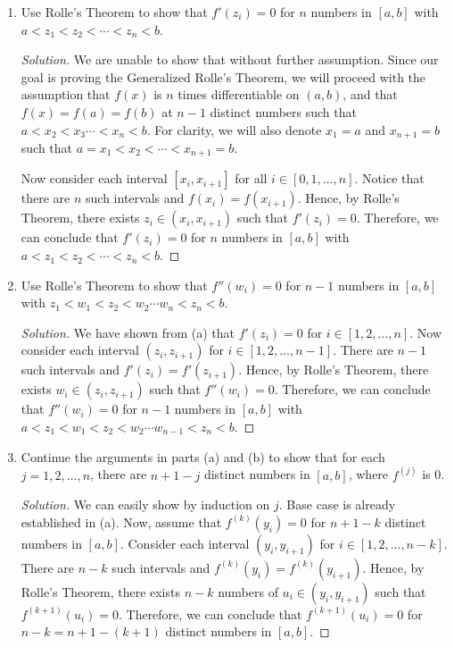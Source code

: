 \documentclass{article}
\begin{document}
\begin{enumerate}[label=\alph*.]
    \item Use Rolle's Theorem to show that $f'(z_i) = 0$ for $n$ numbers in $[a,b]$ with 
    $a < z_1 < z_2 < \cdots < z_{n} < b$.

    \begin{proof}[Solution]
        We are unable to show that without further assumption. Since our goal is proving the 
        Generalized Rolle's Theorem, we will proceed with the assumption that $f(x)$ is $n$ times 
        differentiable on $(a, b)$, and that $f(x) = f(a) = f(b)$ at $n - 1$ distinct numbers such 
        that $a < x_2 < x_3 \cdots < x_n < b$. For clarity, we will also denote $x_1 = a$ and 
        $x_{n+1} = b$ such that $a = x_1 < x_2 < \cdots < x_{n+1} = b$.

        Now consider each interval $[x_i, x_{i+1}]$ for all $i\in [0, 1, \dots, n]$. Notice that 
        there are $n$ such intervals and $f(x_i) = f(x_{i+1})$. Hence, by 
        Rolle's Theorem, there exists $z_i \in (x_i, x_{i+1})$ such that $f'(z_i) = 0$. Therefore, 
        we can conclude that $f'(z_i) = 0$ for $n$ numbers in $[a,b]$ with $a < z_1 < z_2 < \cdots 
        < z_{n} < b$.
    \end{proof}
    
    \item Use Rolle's Theorem to show that $f''(w_i) = 0$ for $n-1$ numbers in $[a,b]$ with 
    $z_1 < w_1 < z_2 < w_2 \cdots w_{n} < z_{n} < b$.

    \begin{proof}[Solution]
        We have shown from (a) that $f'(z_i) = 0$ for $i \in [1, 2, \dots, n]$. Now consider each 
        interval $(z_i, z_{i+1})$ for $i \in [1, 2, \dots, n-1]$. There are $n-1$ such intervals and 
        $f'(z_i) = f'(z_{i+1})$. Hence, by Rolle's Theorem, there exists $w_i \in (z_i, z_{i+1})$ 
        such that $f''(w_i) = 0$. Therefore, we can conclude that $f''(w_i) = 0$ for $n-1$ numbers 
        in $[a,b]$ with $a < z_1 < w_1 < z_2 < w_2 \cdots w_{n-1} < z_{n} < b$.
    \end{proof}

    \item Continue the arguments in parts (a) and (b) to show that for each $j = 1, 2, \dots, n$, 
    there are $n+1-j$ distinct numbers in $[a,b]$, where $f^{(j)}$ is 0.

    \begin{proof}[Solution]
        We can easily show by induction on $j$. Base case is already established in (a). Now, assume that 
        $f^{(k)}(y_i) = 0$ for $n+1-k$ distinct numbers in $[a,b]$. Consider each interval $(y_i, 
        y_{i+1})$ for $i\in [1, 2, \dots, n-k]$. There are $n-k$ such intervals and $f^{(k)}(y_i) =
        f^{(k)}(y_{i+1})$. Hence, by Rolle's Theorem, there exists $n-k$ numbers of $u_i \in (y_i, y_{i+1})$ such 
        that $f^{(k+1)}(u_i) = 0$. Therefore, we can conclude that $f^{(k+1)}(u_i) = 0$ for $n-k = 
        n + 1 - (k+1)$ distinct numbers in $[a,b]$. 


\end{proof}
\end{enumerate}
\end{document}
